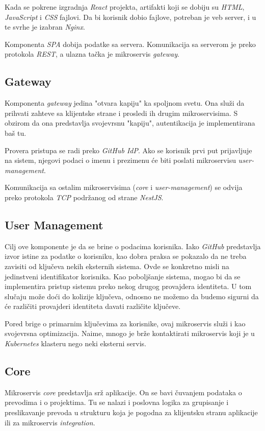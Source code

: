 Kada se pokrene izgradnja \textit{React} projekta, artifakti koji se dobiju 
su \textit{HTML}, \textit{JavaScript} i \textit{CSS} fajlovi. Da bi korisnik dobio fajlove, 
potreban je veb server, i u te svrhe je izabran \textit{Nginx}.

Komponenta \textit{SPA} dobija podatke sa servera. Komunikacija sa serverom 
je preko protokola \textit{REST}, a ulazna tačka je mikroservis \textit{gateway}.

\subsection{Gateway}
Komponenta \textit{gateway} jedina "otvara kapiju" ka spoljnom svetu.
Ona služi da prihvati zahteve sa klijentske strane i prosledi ih 
drugim mikroservisima. S obzirom da ona predstavlja svojevrsnu "kapiju",
autentikacija je implementirana baš tu.

Provera pristupa se radi preko \textit{GitHub IdP}. Ako se korisnik 
prvi put prijavljuje na sistem, njegovi podaci o imenu i prezimenu će 
biti poslati mikroservisu \textit{user-management}. 

Komunikacija sa ostalim mikroservisima (\textit{core} i \textit{user-management})
se odvija preko protokola \textit{TCP} podržanog od strane \textit{NestJS}.

\subsection{User Management}
Cilj ove komponente je da se brine o podacima korisnika. Iako \textit{GitHub} 
predstavlja %
izvor istine za podatke o korisniku, kao dobra praksa se 
pokazalo da ne treba zavisiti od ključeva nekih eksternih sistema. 
Ovde se konkretno misli na jedinstveni identifikator korisnika. Kao 
poboljšanje sistema, mogao bi da se implementira pristup sistemu preko 
nekog drugog provajdera identiteta. U tom slučaju može doći do kolizije 
ključeva, odnosno ne možemo da budemo sigurni da će različiti provajderi identiteta 
davati različite ključeve.

Pored brige o primarnim ključevima za korisnike, ovaj mikroservis služi 
i kao svojevrsna optimizacija. Naime, mnogo je brže kontaktirati 
mikroservis koji je u \textit{Kubernetes} klasteru nego neki eksterni 
servis.

\subsection{Core}
Mikroservis \textit{core} predstavlja srž aplikacije. On se bavi čuvanjem 
podataka o prevodima i o projektima. Tu se nalazi i poslovna logika za 
grupisanje i preslikavanje prevoda u strukturu koja je pogodna za 
klijentsku stranu aplikacije ili za mikroservis \textit{integration}.

